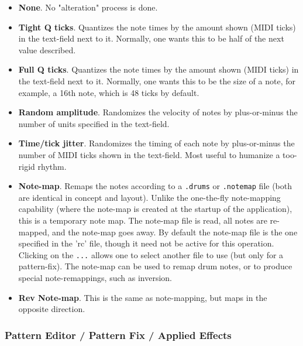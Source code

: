    \begin{itemize}
      \item \textbf{None}.
      No "alteration" process is done.
      \item \textbf{Tight Q ticks}.
         Quantizes the note times by the amount shown (MIDI ticks)
         in the text-field next to it. Normally, one wants this to be
         half of the next value described.
      \item \textbf{Full Q ticks}.
         Quantizes the note times by the amount shown (MIDI ticks)
         in the text-field next to it. Normally, one wants this to be
         the size of a note, for example, a 16th note, which is 48
         ticks by default.
      \item \textbf{Random amplitude}.
         Randomizes the velocity of notes by plus-or-minus the number of units
         specified in the text-field.
      \item \textbf{Time/tick jitter}.
         Randomizes the timing of each note by plus-or-minus the number of
         MIDI ticks shown in the text-field.
         Most useful to humanize a too-rigid rhythm.
      \item \textbf{Note-map}.
         Remaps the notes according to a 
         \texttt{.drums} or \texttt{.notemap} file (both are
         identical in concept and layout).
         Unlike the one-the-fly note-mapping capability (where the
         note-map is created at the startup of the application),
         this is a temporary note map.
         The note-map file is read, all notes are re-mapped, and the
         note-map goes away.
         By default the note-map file is the one specified in the 'rc' file,
         though it need not be active for this operation.
         Clicking on the \texttt{...} allows one to select another file to
         use (but only for a pattern-fix).
         The note-map can be used to remap drum notes, or to produce
         special note-remappings, such as inversion.
      \item \textbf{Rev Note-map}.
         This is the same as note-mapping, but maps in the opposite direction.
   \end{itemize}


\subsubsection{Pattern Editor / Pattern Fix / Applied Effects}
\label{subsubsection:patterns_fix_applied_effects}

